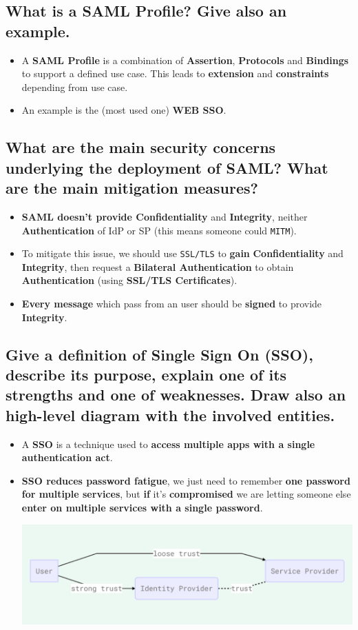 \documentclass[9pt, letterpaper]{article}
\begin{document}
\subsection{What is a SAML Profile? Give also an example.}
\begin{itemize}
	\item A \textbf{SAML Profile} is a combination of \textbf{Assertion}, \textbf{Protocols} and \textbf{Bindings} to support a defined use case. This leads to \textbf{extension} and \textbf{constraints} depending from use case.
	\item An example is the (most used one) \textbf{WEB SSO}.
\end{itemize}

\subsection{What are the main security concerns underlying the deployment of SAML? What are the main mitigation measures?}
\begin{itemize}
	\item \textbf{SAML doesn't provide Confidentiality} and \textbf{Integrity}, neither \textbf{Authentication} of IdP or SP (this means someone could {\tt MITM}).
	\item To mitigate this issue, we should use {\tt SSL/TLS} to \textbf{gain} \textbf{Confidentiality} and \textbf{Integrity}, then request a \textbf{Bilateral Authentication} to obtain \textbf{Authentication} (using \textbf{SSL/TLS Certificates}).
	\item \textbf{Every message} which pass from an user should be \textbf{signed} to provide \textbf{Integrity}.
\end{itemize}

\subsection{Give a definition of Single Sign On (SSO), describe its purpose, explain one of its strengths and one of weaknesses. Draw also an high-level diagram with the involved entities.}
\begin{itemize}
	\item A \textbf{SSO} is a technique used to \textbf{access multiple apps with a single authentication act}.
	\item \textbf{SSO reduces password fatigue}, we just need to remember \textbf{one password for multiple services}, but \textbf{if} it's \textbf{compromised} we are letting someone else \textbf{enter on multiple services with a single password}.
\begin{center}
	\includegraphics[scale=0.6]{SSO.png}
\end{center}
\end{itemize}
\end{document}
